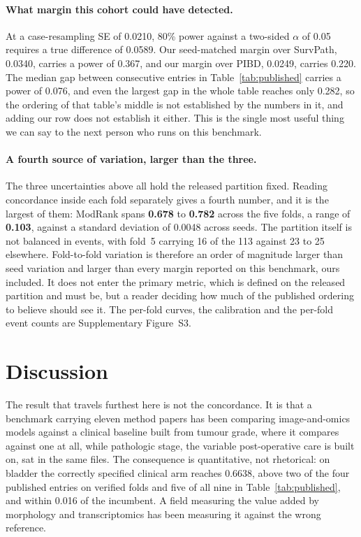 \documentclass[unnumsec,webpdf,contemporary,large]{oup-authoring-template}
\begin{document}
\paragraph{What margin this cohort could have detected.} At a case-resampling SE of 0.0210, 80\%
power against a two-sided $\alpha$ of 0.05 requires a true difference of 0.0589. Our
seed-matched margin over SurvPath, 0.0340, carries a power of 0.367, and our margin over PIBD,
0.0249, carries 0.220. The median gap between consecutive entries in
Table~\ref{tab:published} carries a power of 0.076, and even the largest gap in the whole table
reaches only 0.282, so the ordering of that
table's middle is not established by the numbers in it, and adding our row does not establish it
either. This is the single most useful thing we can say to the next person who runs on this
benchmark.

\paragraph{A fourth source of variation, larger than the three.} The three uncertainties above all
hold the released partition fixed. Reading concordance inside each fold separately gives a fourth
number, and it is the largest of them: ModRank spans \textbf{0.678} to \textbf{0.782} across the
five folds, a range of \textbf{0.103}, against a standard deviation of 0.0048 across seeds. The
partition itself is not balanced in events, with fold~5 carrying 16 of the 113 against 23 to 25
elsewhere. Fold-to-fold variation is therefore an order of magnitude larger than seed variation and
larger than every margin reported on this benchmark, ours included. It does not enter the primary
metric, which is defined on the released partition and must be, but a reader deciding how much of
the published ordering to believe should see it. The per-fold curves, the calibration and the
per-fold event counts are Supplementary Figure~S3.

\section{Discussion}
The result that travels furthest here is not the concordance. It is that a benchmark carrying
eleven method papers has been comparing image-and-omics models against a clinical baseline built
from tumour grade, where it compares against one at all, while pathologic stage, the variable post-operative care is built on, sat in the same
files. The consequence is quantitative, not rhetorical: on bladder the correctly specified clinical
arm reaches 0.6638, above two of the four published entries on verified folds and five of all
nine in Table~\ref{tab:published}, and within 0.016 of the incumbent. A field measuring the value added by
morphology and transcriptomics has been measuring it against the wrong reference.
\end{document}
